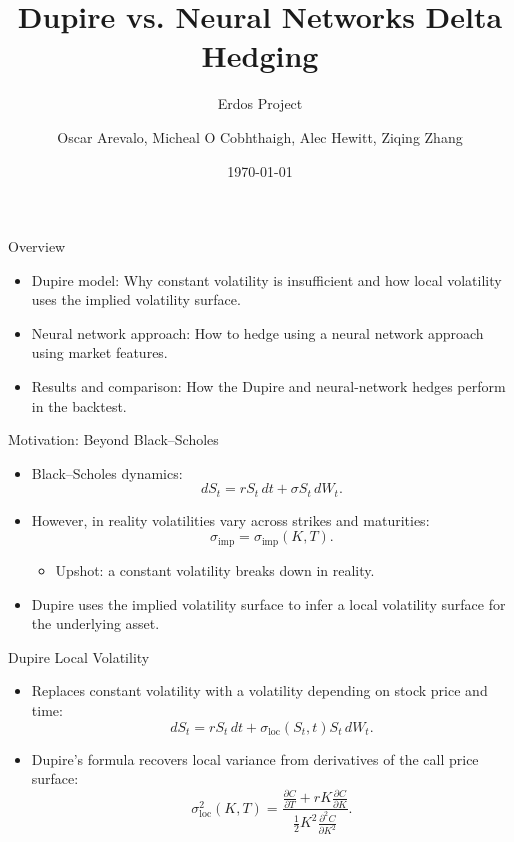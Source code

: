 \documentclass[aspectratio=169,11pt]{beamer}
\title[]{
Dupire vs. Neural Networks Delta Hedging}
\subtitle{Erdos Project}
\author[Arevalo, O Cobhthaigh, Hewitt, Zhang]{Oscar Arevalo, Micheal O Cobhthaigh, Alec Hewitt, Ziqing Zhang}
\date{\today}
\begin{document}
\begin{frame}
  \titlepage
\end{frame}



\begin{frame}{Overview}
\begin{itemize}
    \item Dupire model: Why constant volatility is insufficient and how local volatility uses the implied volatility surface.
    \item Neural network approach: How to hedge using a neural network approach using market features.
    \item Results and comparison: How the Dupire and neural-network hedges perform in the backtest.
\end{itemize}
\end{frame}

\begin{frame}{Motivation: Beyond Black--Scholes}
  \begin{itemize}
    \item Black--Scholes dynamics:
    \[
      dS_t = rS_t\,dt + \sigma S_t\,dW_t .
    \]
    \item However, in reality volatilities vary across strikes and maturities:
    \[
      \sigma_{\mathrm{imp}} = \sigma_{\mathrm{imp}}(K,T).
    \]
    \begin{itemize}
        \item Upshot: a constant volatility breaks down in reality.
    \end{itemize}
    
\item Dupire uses the implied volatility surface to infer a local volatility surface for the underlying asset.
  \end{itemize}
\end{frame}

\begin{frame}{Dupire Local Volatility}
  \begin{itemize}
    \item Replaces constant volatility with a volatility depending on stock price and time:
    \[
      dS_t = rS_t\,dt + \sigma_{\mathrm{loc}}(S_t,t)S_t\,dW_t .
    \]
    \item Dupire's formula recovers local variance from derivatives of the call price surface:
    \[
      \sigma_{\mathrm{loc}}^2(K,T)
      =
      \frac{\frac{\partial C}{\partial T}
      + rK\frac{\partial C}{\partial K}}
      {\frac{1}{2}K^2\frac{\partial^2 C}{\partial K^2}}.
    \]
  \end{itemize}
\end{frame}
\end{document}

